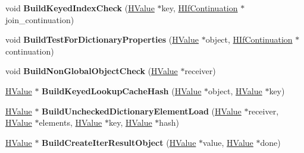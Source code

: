 \begin{DoxyCompactItemize}
\item 
void {\bfseries Build\+Keyed\+Index\+Check} (\hyperlink{classv8_1_1internal_1_1_h_value}{H\+Value} $\ast$key, \hyperlink{classv8_1_1internal_1_1_h_if_continuation}{H\+If\+Continuation} $\ast$join\+\_\+continuation)\hypertarget{classv8_1_1internal_1_1_h_graph_builder_a9dc6a61b97712f5bae1d2e2b6c6b75ff}{}\label{classv8_1_1internal_1_1_h_graph_builder_a9dc6a61b97712f5bae1d2e2b6c6b75ff}

\item 
void {\bfseries Build\+Test\+For\+Dictionary\+Properties} (\hyperlink{classv8_1_1internal_1_1_h_value}{H\+Value} $\ast$object, \hyperlink{classv8_1_1internal_1_1_h_if_continuation}{H\+If\+Continuation} $\ast$continuation)\hypertarget{classv8_1_1internal_1_1_h_graph_builder_ae130cb7f3b8c74d84a46d2161bf643a6}{}\label{classv8_1_1internal_1_1_h_graph_builder_ae130cb7f3b8c74d84a46d2161bf643a6}

\item 
void {\bfseries Build\+Non\+Global\+Object\+Check} (\hyperlink{classv8_1_1internal_1_1_h_value}{H\+Value} $\ast$receiver)\hypertarget{classv8_1_1internal_1_1_h_graph_builder_a1c0cd4f82e51b7d9557ceb940501e7fc}{}\label{classv8_1_1internal_1_1_h_graph_builder_a1c0cd4f82e51b7d9557ceb940501e7fc}

\item 
\hyperlink{classv8_1_1internal_1_1_h_value}{H\+Value} $\ast$ {\bfseries Build\+Keyed\+Lookup\+Cache\+Hash} (\hyperlink{classv8_1_1internal_1_1_h_value}{H\+Value} $\ast$object, \hyperlink{classv8_1_1internal_1_1_h_value}{H\+Value} $\ast$key)\hypertarget{classv8_1_1internal_1_1_h_graph_builder_a61eb8e2b19749149f6f93a9832fa57e7}{}\label{classv8_1_1internal_1_1_h_graph_builder_a61eb8e2b19749149f6f93a9832fa57e7}

\item 
\hyperlink{classv8_1_1internal_1_1_h_value}{H\+Value} $\ast$ {\bfseries Build\+Unchecked\+Dictionary\+Element\+Load} (\hyperlink{classv8_1_1internal_1_1_h_value}{H\+Value} $\ast$receiver, \hyperlink{classv8_1_1internal_1_1_h_value}{H\+Value} $\ast$elements, \hyperlink{classv8_1_1internal_1_1_h_value}{H\+Value} $\ast$key, \hyperlink{classv8_1_1internal_1_1_h_value}{H\+Value} $\ast$hash)\hypertarget{classv8_1_1internal_1_1_h_graph_builder_a01201a4975c1ae58c5c0bab0b460cd6c}{}\label{classv8_1_1internal_1_1_h_graph_builder_a01201a4975c1ae58c5c0bab0b460cd6c}

\item 
\hyperlink{classv8_1_1internal_1_1_h_value}{H\+Value} $\ast$ {\bfseries Build\+Create\+Iter\+Result\+Object} (\hyperlink{classv8_1_1internal_1_1_h_value}{H\+Value} $\ast$value, \hyperlink{classv8_1_1internal_1_1_h_value}{H\+Value} $\ast$done)\hypertarget{classv8_1_1internal_1_1_h_graph_builder_a69ed37a402f8358e46b5b0a1672db2ec}{}\label{classv8_1_1internal_1_1_h_graph_builder_a69ed37a402f8358e46b5b0a1672db2ec}


\end{DoxyCompactItemize}
